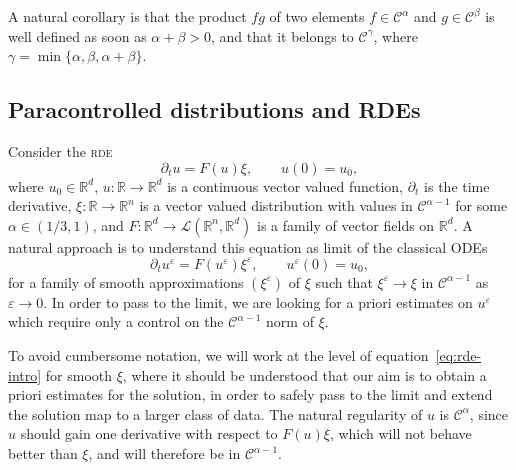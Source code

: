 \documentclass[11pt,a4paper]{article}
\theoremstyle{remark}
\newcommand{\R}{\mathbb{R}}
\newcommand{\Lcal}{\mathcal{L}}
\newcommand{\CC}{\ensuremath{\mathscr{C}}}
\begin{document}
A natural corollary is that the product $fg$ of two elements $f \in \CC^{\alpha}$ and $g \in \CC^{\beta}$ is well defined as soon as $\alpha + \beta >0$, and that it belongs to $\CC^{\gamma}$, where $\gamma = \min \{\alpha , \beta , \alpha + \beta \}$.


\subsection{Paracontrolled distributions and RDEs}\label{sec:paracontrolled ode}

Consider the \textsc{rde}
\begin{equation}\label{eq:rde-intro} 
  \partial_{t} u=F ( u ) \xi, \qquad u(0) = u_0,
\end{equation}
where $u_0 \in \R^d$, $u\colon \mathbb{R} \rightarrow \mathbb{R}^{d}$ is a continuous vector
valued function, $\partial_{t}$ is the time derivative, $\xi\colon \mathbb{R} \rightarrow \mathbb{R}^{n}$ is a vector valued distribution with values in
$\CC^{\alpha -1}$ for some $\alpha \in ( 1/3,1 )$, and
$F\colon \mathbb{R}^{d} \rightarrow \Lcal ( \mathbb{R}^{n} ,\mathbb{R}^{d})$ is a family of vector fields on $\mathbb{R}^{d}$. A natural approach is to
understand this equation as limit of the classical ODEs
\begin{equation}\label{eq:rde-reg-intro}
  \partial_{t} u^{\varepsilon} = F ( u^{\varepsilon} ) \xi^{\varepsilon}, \qquad u^\varepsilon(0) = u_0,
\end{equation}
for a family of smooth approximations $(\xi^{\varepsilon})$ of $\xi$ such that
$\xi^{\varepsilon} \rightarrow \xi$ in $\CC^{\alpha -1}$ as $\varepsilon \rightarrow 0$. In order to pass to the limit, we are looking for a
priori estimates on $u^{\varepsilon}$ which require only a control on the
$\CC^{\alpha -1}$ norm of $\xi$.

To avoid cumbersome notation, we will work at the level of
equation~{\eqref{eq:rde-intro}} for smooth $\xi$, where it should be understood that
our aim is to obtain a priori estimates for the solution, in order to safely pass
to the limit and extend the solution map to a larger class of data. The
natural regularity of $u$ is $\CC^{\alpha}$, since $u$ should gain one
derivative with respect to $F ( u ) \xi$, which will not behave better than
$\xi$, and will therefore be in $\CC^{\alpha -1}$.
\end{document}
